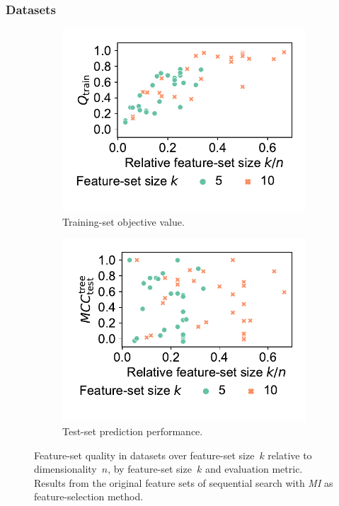 \documentclass{article}
\theoremstyle{definition}
\begin{document}
\subsubsection{Datasets}
\label{sec:afs:appendix:evaluation:datasets}

\begin{figure}[t]
	\centering
	\begin{subfigure}[t]{0.48\textwidth}
		\centering
		\includegraphics[width=\textwidth, trim=15 30 15 15, clip]{plots/afs-impact-dataset-k-train-objective.pdf}
		\caption{Training-set objective value.}
		\label{fig:afs:impact-dataset-k-train-objective}
	\end{subfigure}
	\hfill
	\begin{subfigure}[t]{0.48\textwidth}
		\centering
		\includegraphics[width=\textwidth, trim=15 30 15 15, clip]{plots/afs-impact-dataset-k-decision-tree-test-mcc.pdf}
		\caption{Test-set prediction performance.}
		\label{fig:afs:impact-dataset-k-decision-tree-test-mcc}
	\end{subfigure}
	\caption{
		Feature-set quality in datasets over feature-set size~$k$ relative to dimensionality~$n$, by feature-set size~$k$ and evaluation metric.
		Results from the original feature sets of sequential search with \emph{MI} as feature-selection method.
	}
	\label{fig:afs:impact-dataset-k-quality}
\end{figure}
\end{document}

